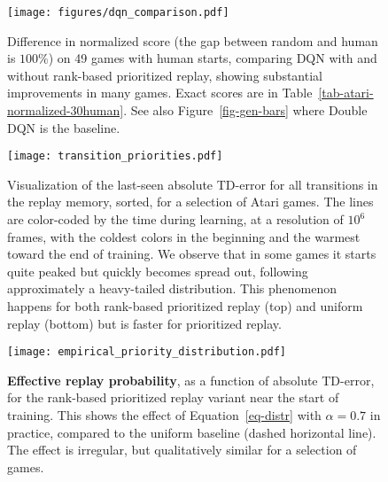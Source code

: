 \documentclass[a4paper]{article}
\begin{document}
\begin{figure}[p]
\centerline{
\texttt{[image: figures/dqn\_comparison.pdf]} }
\caption{
\label{fig-dqn-bars}
Difference in normalized score (the gap between random and human is $100\%$) on 49 games with human starts, comparing DQN with and without rank-based prioritized replay, 
showing substantial improvements in many games.  Exact scores are in Table~\ref{tab-atari-normalized-30human}.
See also Figure~\ref{fig-gen-bars} where Double DQN is the baseline.
}
\end{figure}






\begin{figure}[p]
\centerline{
\texttt{[image: transition\_priorities.pdf]}
}
\caption{
\label{fig-transition-priorities}
Visualization of the last-seen absolute TD-error for all transitions in the replay memory, sorted, for a selection of Atari games. 
The lines are color-coded by the time during learning, at a resolution of $10^6$ frames, with the coldest colors in the beginning and the warmest toward the end of training.
We observe that in some games it starts quite peaked but quickly becomes spread out, following approximately a heavy-tailed distribution. This phenomenon happens for both rank-based prioritized replay (top) and uniform replay (bottom) but is faster for prioritized replay.
}
\end{figure}




\begin{figure}[p]
\centerline{
\texttt{[image: empirical\_priority\_distribution.pdf]}
}
\caption{
\label{fig-priority-distribution}
{\bf Effective replay probability}, as a function of absolute TD-error, for the rank-based prioritized replay variant near the start of training. 
This shows the effect of Equation~\ref{eq-distr} with $\alpha=0.7$ in practice, compared to the uniform baseline (dashed horizontal line).
The effect is irregular, but qualitatively similar for a selection of games.
}
\end{figure}
\end{document}
